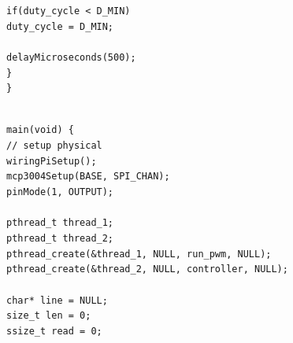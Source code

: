 \documentclass[a4paper, 12pt]{article}
\begin{document}
\begin{appendices}
	\texttt{\hspace*{2em}if(duty\_cycle < D\_MIN)} \\\noindent
	\texttt{\hspace*{3em}duty\_cycle = D\_MIN;} \\\noindent
	\texttt{ \\\noindent}
	\texttt{\hspace*{2em}delayMicroseconds(500);} \\\noindent
	\texttt{\hspace*{1em}\}}\\\noindent
        \texttt{\}} \\\noindent
        \texttt{ \\\noindent}

	\texttt{main(void) \{ \\\noindent}
	\texttt{\hspace*{1em}// setup physical} \\\noindent
	\texttt{\hspace*{1em}wiringPiSetup();} \\\noindent
	\texttt{\hspace*{1em}mcp3004Setup(BASE, SPI\_CHAN);} \\\noindent
	\texttt{\hspace*{1em}pinMode(1, OUTPUT); } \\\noindent
	\texttt{\hspace*{1em}\\\noindent}
	\texttt{\hspace*{1em}pthread\_t thread\_1;} \\\noindent
	\texttt{\hspace*{1em}pthread\_t thread\_2;} \\\noindent
	\texttt{\hspace*{1em}pthread\_create(\&thread\_1, NULL, run\_pwm, NULL);} \\\noindent
	\texttt{\hspace*{1em}pthread\_create(\&thread\_2, NULL, controller, NULL);} \\\noindent
	\texttt{\hspace*{1em}\\\noindent}
	\texttt{\hspace*{1em}char* line = NULL;} \\\noindent
	\texttt{\hspace*{1em}size\_t len = 0;} \\\noindent
	\texttt{\hspace*{1em}ssize\_t read = 0;} \\\noindent

\end{appendices}
\end{document}
